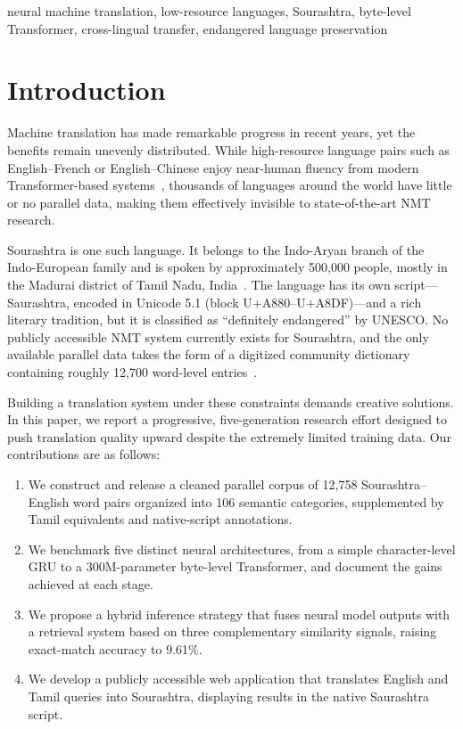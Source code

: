 \documentclass[conference]{IEEEtran}
\begin{document}
\begin{IEEEkeywords}
neural machine translation, low-resource languages, Sourashtra, byte-level Transformer, cross-lingual transfer, endangered language preservation
\end{IEEEkeywords}

\section{Introduction}

Machine translation has made remarkable progress in recent years, yet the benefits remain unevenly distributed. While high-resource language pairs such as English--French or English--Chinese enjoy near-human fluency from modern Transformer-based systems~\cite{vaswani2017attention}, thousands of languages around the world have little or no parallel data, making them effectively invisible to state-of-the-art NMT research.

Sourashtra is one such language. It belongs to the Indo-Aryan branch of the Indo-European family and is spoken by approximately 500,000 people, mostly in the Madurai district of Tamil Nadu, India~\cite{ethnologue2023}. The language has its own script---Saurashtra, encoded in Unicode 5.1 (block U+A880--U+A8DF)---and a rich literary tradition, but it is classified as ``definitely endangered'' by UNESCO. No publicly accessible NMT system currently exists for Sourashtra, and the only available parallel data takes the form of a digitized community dictionary containing roughly 12,700 word-level entries~\cite{sourashtra_dict}.

Building a translation system under these constraints demands creative solutions. In this paper, we report a progressive, five-generation research effort designed to push translation quality upward despite the extremely limited training data. Our contributions are as follows:

\begin{enumerate}
    \item We construct and release a cleaned parallel corpus of 12,758 Sourashtra--English word pairs organized into 106 semantic categories, supplemented by Tamil equivalents and native-script annotations.
    \item We benchmark five distinct neural architectures, from a simple character-level GRU to a 300M-parameter byte-level Transformer, and document the gains achieved at each stage.
    \item We propose a hybrid inference strategy that fuses neural model outputs with a retrieval system based on three complementary similarity signals, raising exact-match accuracy to 9.61\%.
    \item We develop a publicly accessible web application that translates English and Tamil queries into Sourashtra, displaying results in the native Saurashtra script.
\end{enumerate}
\end{document}
